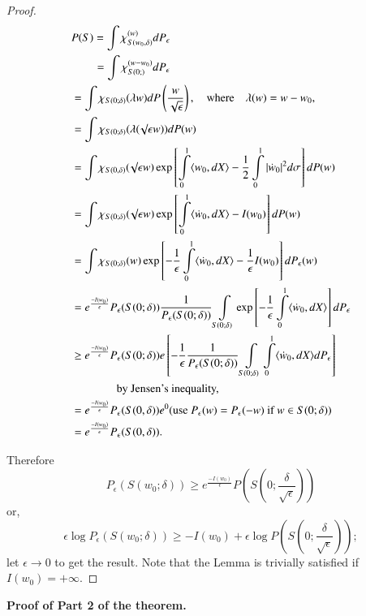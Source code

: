 \begin{proof}
\begin{align*}
& P(S)=\int \chi^{(w)}_{S(w_{0},\delta)}dP_{\epsilon}\\
&\qquad =\int\chi_{S(0;)}^{(w-w_{0})}dP_{\epsilon}\\
&= \int \chi_{S(0;\delta)}(\lambda
  w)dP\left(\frac{w}{\sqrt{\epsilon}}\right),\quad\text{where}\quad
  \lambda(w)=w-w_{0},\\
&= \int \chi_{S(0;\delta)}(\lambda(\surd\epsilon w))dP(w)\\
&= \int\chi_{S(0,\delta)}(\surd \epsilon w)\exp
  \left[\int\limits^{1}_{0}\langle w_{0},dX\rangle
    -\frac{1}{2}\int\limits^{1}_{0}|\dot{w}_{0}|^{2}d\sigma\right]dP(w)\\
&=\int\chi_{S(0;\delta)}(\surd \epsilon w)\exp
  \left[\int\limits^{1}_{0}\langle \dot{w}_{0},dX\rangle
    -I(w_{0})\right]dP(w)\\
&= \int\chi_{S(0;\delta)}(w)\exp
  \left[-\frac{1}{\epsilon}\int\limits^{1}_{0}\langle
    \dot{w}_{0},dX\rangle
    -\frac{1}{\epsilon}I(w_{0})\right]dP_{\epsilon}(w)\\
&=
  e^{\frac{-I(w_{0})}{\epsilon}}P_{\epsilon}(S(0;\delta))\frac{1}{P_{\epsilon}(S(0;\delta))}\int\limits_{S(0;\delta)}\exp\left[-\frac{1}{\epsilon}\int\limits^{1}_{0}\langle
    \dot{w}_{0},dX\rangle\right]dP_{\epsilon}\\
&\geq
  e^{\frac{-I(w_{0})}{\epsilon}}P_{\epsilon}(S(0;\delta))e\left[-\frac{1}{\epsilon}\frac{1}{P_{\epsilon}(S(0;\delta))}\int\limits_{S(0;\delta)}\int\limits^{1}_{0}\langle
    \dot{w}_{0},dX\rangle dP_{\epsilon}\right]\\
&\qquad\qquad \text{by Jensen's inequality,}\\
&=
  e^{\frac{-I(w_{0})}{\epsilon}}P_{\epsilon}(S(0,\delta))e^{0}(\text{use~
  } P_{\epsilon}(w)=P_{\epsilon}(-w)\text{~ if~ }w\in S(0;\delta))\\
&= e^{\frac{-I(w_{0})}{\epsilon}}P_{\epsilon}(S(0,\delta)).
\end{align*}\pageoriginale

Therefore
$$
P_{\epsilon}(S(w_{0};\delta))\geq
e^{\frac{-I(w_{0})}{\epsilon}}P(S(0;\frac{\delta}{\sqrt{\epsilon}}))
$$
or,
$$
\epsilon\log P_{\epsilon}(S(w_{0};\delta))\geq -I(w_{0})+\epsilon \log
P(S(0;\frac{\delta}{\sqrt{\epsilon}}));
$$
let $\epsilon\to 0$ to get the result. Note that the Lemma is
trivially satisfied if $I(w_{0})=+\infty$.
\end{proof}

\noindent
{\bf Proof of Part 2 of the theorem.}

